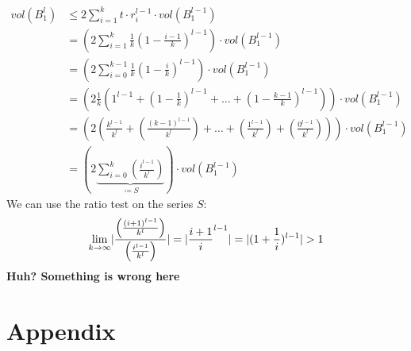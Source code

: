 \documentclass[12pt]{article}
\DeclarePairedDelimiter\abs{\lvert}{\rvert}
\begin{document}
\begin{enumerate}[label=(\alph*)]
\begin{align*}
				vol(B_1^l) &\leq 2 \sum_{i=1}^k t \cdot r_i^{l-1} \cdot vol(B_1^{l-1}) \\
				&= \left( 2 \sum_{i=1}^k \frac{1}{k} \left( 1 - \frac{i-1}{k} \right) ^ {l-1} \right) \cdot vol(B_1^{l-1}) \\
				&= \left( 2 \sum_{i=0}^{k-1} \frac{1}{k} \left( 1 - \frac{i}{k} \right) ^ {l-1} \right) \cdot vol(B_1^{l-1}) \\
				&= \left( 2 \frac{1}{k} \left( 1^{l-1} + (1 - \frac{1}{k})^{l-1} + \dots + (1 - \frac{k-1}{k})^{l-1} \right) \right) \cdot vol(B_1^{l-1}) \\
				&= \left( 2 \left( \frac{k^{l-1}}{k^l} + (\frac{(k-1)^{l-1}}{k^l}) + \dots + (\frac{1^{l-1}}{k^l}) + (\frac{0^{l-1}}{k^l}) \right) \right) \cdot vol(B_1^{l-1}) \\
				&= \left( 2 \underbrace{\sum_{i=0}^{k} \left( \frac{i^{l-1}}{k^l} \right)}_{\coloneqq S} \right) \cdot vol(B_1^{l-1})
			\end{align*}
			We can use the ratio test on the series $S$:
			\begin{align*}
				\lim_{k \rightarrow \infty} \abs{\frac{\left( \frac{(i + 1)^{l-1}}{k^l} \right)}{\left( \frac{i^{l-1}}{k^l} \right)}} = \abs{\frac{i+1}{i} ^ {l-1}} = \abs{(1 + \frac{1}{i}) ^ {l-1}} > 1
			\end{align*}
			\textbf{Huh? Something is wrong here}
\end{enumerate}

\section*{Appendix}\label{appendix}
\end{document}
